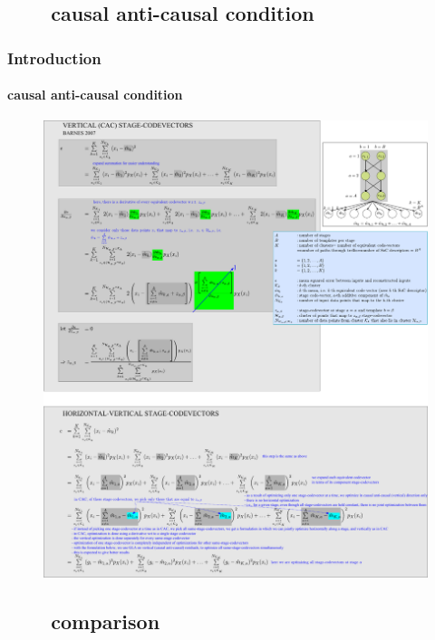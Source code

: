 \subsection{\ \ \ \ causal anti-causal condition}
\begin{frame}
\frametitle{Introduction}
\framesubtitle{causal anti-causal condition}
\logoCSIPCPL\mypagenum
		\begin{figure}				
			\includegraphics[width=1.0\textwidth]{figs/RVQ_CAC_derivation.pdf}
		\end{figure}
\end{frame}


\subsection{\ \ \ \ comparison}


